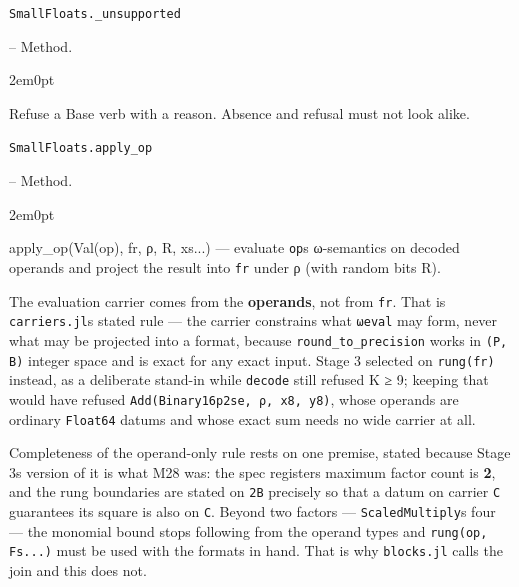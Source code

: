 \par\medskip\noindent\begin{minipage}{\linewidth}
\hypertarget{1161894050593661291}{\texttt{SmallFloats.\_\allowbreak{}unsupported}}  -- {Method.}
\nopagebreak
\begin{adjustwidth}{2em}{0pt}

Refuse a Base verb with a reason. Absence and refusal must not look alike.



\end{adjustwidth}
\end{minipage}
\par\medskip

\par\medskip\noindent\begin{minipage}{\linewidth}
\hypertarget{14023424897002283292}{\texttt{SmallFloats.apply\_\allowbreak{}op}}  -- {Method.}
\nopagebreak
\begin{adjustwidth}{2em}{0pt}

apply\_\allowbreak{}op(Val(op), fr, ρ, R, xs...) — evaluate \texttt{op}{\textquotesingle}s ω-semantics on decoded operands and project the result into \texttt{fr} under ρ (with random bits R).

The evaluation carrier comes from the \textbf{operands}, not from \texttt{fr}. That is \texttt{carriers.jl}{\textquotesingle}s stated rule — the carrier constrains what \texttt{ωeval} may form, never what may be projected into a format, because \texttt{round\_\allowbreak{}to\_\allowbreak{}precision} works in \texttt{(P, B)} integer space and is exact for any exact input. Stage 3 selected on \texttt{rung(fr)} instead, as a deliberate stand-in while \texttt{decode} still refused K ≥ 9; keeping that would have refused \texttt{Add(\allowbreak{}Binary16p2se, ρ, x8, y8)}, whose operands are ordinary \texttt{Float64} datums and whose exact sum needs no wide carrier at all.

Completeness of the operand-only rule rests on one premise, stated because Stage 3{\textquotesingle}s version of it is what M28 was: the spec register{\textquotesingle}s maximum factor count is \textbf{2}, and the rung boundaries are stated on \texttt{2B} precisely so that a datum on carrier \texttt{C} guarantees its square is also on \texttt{C}. Beyond two factors — \texttt{ScaledMultiply}{\textquotesingle}s four — the monomial bound stops following from the operand types and \texttt{rung(op, Fs...)} must be used with the formats in hand. That is why \texttt{blocks.jl} calls the join and this does not.



\end{adjustwidth}
\end{minipage}
\par\medskip

